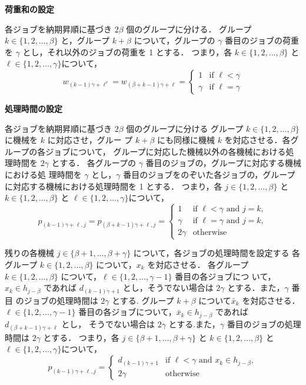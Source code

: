 \documentclass[12pt]{optlab-bachelor}
\begin{document}
\noindent \textbf{荷重和の設定}

各ジョブを納期昇順に基づき $2\beta$ 個のグループに分ける．
グループ $k \in \{1,2,\ldots,\beta\}$ と，グループ $k + \beta$ について，グループの $\gamma$ 番目のジョブの荷重を $\gamma$ とし，それ以外のジョブの荷重を 1 とする．
つまり，各 $k \in \{1,2,\ldots, \beta\}$ と $\ell \in \{1,2,\ldots,
\gamma\}$について，
$$w_{(k - 1)\gamma + \ell^v} = w_{(\beta + k - 1)\gamma + \ell} = \left\{ \begin{array}{ll} 1 & \text{if } \ell < \gamma \\ \gamma & \text{if } \ell = \gamma \end{array} \right.$$

\noindent \textbf{処理時間の設定}

各ジョブを納期昇順に基づき $2\beta$ 個のグループに分ける
グループ $k \in \{1,2,\ldots,\beta\}$ に機械を $k$ に対応させ，グルー
プ $k + \beta$ にも同様に機械 $k$ を対応させる．各グループの各ジョブについて， グループに対応した機械以外の各機械における処理時間を $2\gamma$ とする．
各グループの $\gamma$ 番目のジョブの，グループに対応する機械における処
理時間を $\gamma$ とし，$\gamma$ 番目のジョブをのぞいた各ジョブの，グループに対応する機械における処理時間を 1 とする．
つまり，各 $j \in \{1,2,\ldots, \beta\}$ と $k \in \{1,2,\ldots,
\beta\}$ と $\ell \in \{1,2,\ldots, \gamma\}$について，
$$p_{(k - 1)\gamma + \ell, j} = p_{(\beta + k - 1)\gamma + \ell, j} = \left\{ \begin{array}{ll} 1 & \text{if } \ell < \gamma \text{ and } j = k, \\ \gamma & \text{if } \ell = \gamma \text{ and } j = k, \\ 2\gamma & \text{otherwise}\end{array} \right.$$

残りの各機械 $j \in \{\beta + 1, \ldots , \beta + \gamma\}$ について，各ジョブの処理時間を設定する
各グループ $k \in \{1,2,\ldots,\beta\}$ について，$x_k$ を対応させる．
各グループ $k \in \{1,2,\ldots,\beta\}$ について，$\ell \in \{1,2,\ldots, \gamma - 1\}$ 番目の各ジョブにつ いて，$x_k \in h_{j - \beta}$ であれば $d_{(k - 1)\gamma + 1}$ とし，そうでない場合は $2\gamma$ とする．また，$\gamma$ 番目 のジョブの処理時間は $2\gamma$ とする.
グループ $k + \beta$ について$\bar x_k$ を対応させる．
$\ell \in \{1,2,\ldots, \gamma - 1\}$ 番目の各ジョブについて，$\bar x_k \in h_{j - \beta}$ であれば $d_{(\beta + k - 1)\gamma + \ell}$ とし， そうでない場合は $2\gamma$ とする.また，$\gamma$ 番目のジョブの処理時間は $2\gamma$ とする．
つまり，各 $j \in \{\beta + 1,\ldots, \beta + \gamma\}$ と $k \in
\{1,2,\ldots, \beta\}$ と $\ell \in \{1,2,\ldots, \gamma\}$について，
$$p_{(k - 1)\gamma + \ell, j} = \left\{ \begin{array}{ll} d_{(k - 1)\gamma + 1} & \text{if } \ell < \gamma \text{ and } x_k \in h_{j - \beta}, \\ 2\gamma & \text{otherwise} \end{array} \right.$$
\end{document}
